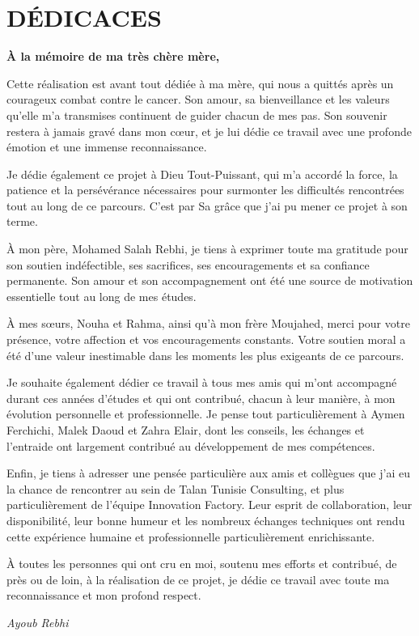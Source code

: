 \chapter*{DÉDICACES}
\thispagestyle{MyStyle}

\begingroup
\itshape

\begin{center}
{\large\bfseries À la mémoire de ma très chère mère,}
\end{center}

\bigskip

Cette réalisation est avant tout dédiée à ma mère, qui nous a quittés après
un courageux combat contre le cancer. Son amour, sa bienveillance et les valeurs qu'elle
m'a transmises continuent de guider chacun de mes pas. Son souvenir restera à jamais gravé
dans mon c\oe ur, et je lui dédie ce travail avec une profonde émotion et une immense
reconnaissance.

Je dédie également ce projet à Dieu Tout-Puissant, qui m'a accordé la force, la patience et
la persévérance nécessaires pour surmonter les difficultés rencontrées tout au long de ce
parcours. C'est par Sa grâce que j'ai pu mener ce projet à son terme.

À mon père, Mohamed Salah Rebhi, je tiens à exprimer toute ma gratitude pour son soutien
indéfectible, ses sacrifices, ses encouragements et sa confiance permanente. Son amour et
son accompagnement ont été une source de motivation essentielle tout au long de mes études.

À mes s\oe urs, Nouha et Rahma, ainsi qu'à mon frère Moujahed, merci pour votre présence,
votre affection et vos encouragements constants. Votre soutien moral a été d'une valeur
inestimable dans les moments les plus exigeants de ce parcours.

Je souhaite également dédier ce travail à tous mes amis qui m'ont accompagné durant ces
années d'études et qui ont contribué, chacun à leur manière, à mon évolution personnelle et
professionnelle. Je pense tout particulièrement à Aymen Ferchichi, Malek Daoud et Zahra Elair,
dont les conseils, les échanges et l'entraide ont largement contribué au développement de
mes compétences.

Enfin, je tiens à adresser une pensée particulière aux amis et collègues que j'ai eu la
chance de rencontrer au sein de Talan Tunisie Consulting, et plus particulièrement de
l'équipe Innovation Factory. Leur esprit de collaboration, leur disponibilité, leur bonne
humeur et les nombreux échanges techniques ont rendu cette expérience humaine et
professionnelle particulièrement enrichissante.

À toutes les personnes qui ont cru en moi, soutenu mes efforts et contribué, de près ou de
loin, à la réalisation de ce projet, je dédie ce travail avec toute ma reconnaissance et mon
profond respect.

\bigskip

{\raggedleft\normalfont\large\itshape Ayoub Rebhi\par}

\endgroup
